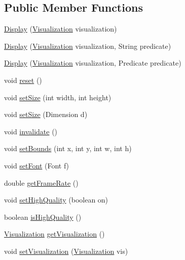 \subsection*{\-Public \-Member \-Functions}
\begin{DoxyCompactItemize}
\item 
\hyperlink{classprefuse_1_1_display_ad424364a88e9886cd1483958035fb890}{\-Display} (\hyperlink{classprefuse_1_1_visualization}{\-Visualization} visualization)
\item 
\hyperlink{classprefuse_1_1_display_aae0df9b41845b2342b8bfe872249b784}{\-Display} (\hyperlink{classprefuse_1_1_visualization}{\-Visualization} visualization, \-String predicate)
\item 
\hyperlink{classprefuse_1_1_display_a1f7ed47dd3ff247553d443bbb5cb443e}{\-Display} (\hyperlink{classprefuse_1_1_visualization}{\-Visualization} visualization, \-Predicate predicate)
\item 
void \hyperlink{classprefuse_1_1_display_a91f764a0d273666d127405bfafff3abd}{reset} ()
\item 
void \hyperlink{classprefuse_1_1_display_aae49785b6562c001901b154feb2a512d}{set\-Size} (int width, int height)
\item 
void \hyperlink{classprefuse_1_1_display_a79a20d2bb347ef95ab3655605675aeac}{set\-Size} (\-Dimension d)
\item 
void \hyperlink{classprefuse_1_1_display_a271a7aa495f913838a6ad3cbdac37dbd}{invalidate} ()
\item 
void \hyperlink{classprefuse_1_1_display_ad39eb10bcc5655c1d1d688b4ecb85f8c}{set\-Bounds} (int x, int y, int w, int h)
\item 
void \hyperlink{classprefuse_1_1_display_acff42d70280bee8d15453b0fbb022ae3}{set\-Font} (\-Font f)
\item 
double \hyperlink{classprefuse_1_1_display_a66b764755d5d6f7150884408f0095dfc}{get\-Frame\-Rate} ()
\item 
void \hyperlink{classprefuse_1_1_display_a8221733df785dee4e6c0d1b4ede034e2}{set\-High\-Quality} (boolean on)
\item 
boolean \hyperlink{classprefuse_1_1_display_a992dd7e2345ea710d91f620b31ff7101}{is\-High\-Quality} ()
\item 
\hyperlink{classprefuse_1_1_visualization}{\-Visualization} \hyperlink{classprefuse_1_1_display_a1854817b565a45a48e759054a7e65f04}{get\-Visualization} ()
\item 
void \hyperlink{classprefuse_1_1_display_adbe30cf6361872089b006128c5769609}{set\-Visualization} (\hyperlink{classprefuse_1_1_visualization}{\-Visualization} vis)

\end{DoxyCompactItemize}
